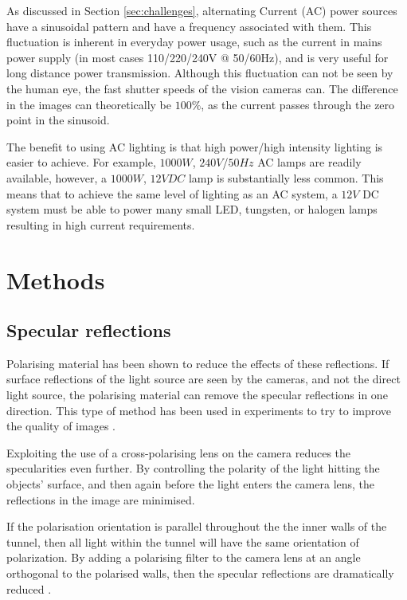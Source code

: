 \documentclass[fleqn,twoside,12pt]{report}
\begin{document}
As discussed in Section \ref{sec:challenges}, alternating Current (AC) power sources have a sinusoidal pattern and have a frequency associated with them. This fluctuation is inherent in everyday power usage, such as the current in mains power supply (in most cases 110/220/240V @ 50/60Hz), and is very useful for long distance power transmission. Although this fluctuation can not be seen by the human eye, the fast shutter speeds of the vision cameras can. The difference in the images can theoretically be $100\%$, as the current passes through the zero point in the sinusoid.

The benefit to using AC lighting is that high power/high intensity lighting is easier to achieve. For example, $1000W$, $240V$/$50Hz$ AC lamps are readily available, however, a $1000W$, $12VDC$ lamp is substantially less common. This means that to achieve the same level of lighting as an AC system, a $12V$ DC system must be able to power many small LED, tungsten, or halogen lamps resulting in high current requirements.  


\section{Methods}

\subsection{Specular reflections}

Polarising material has been shown to reduce the effects of these reflections. If surface reflections of the light source are seen by the cameras, and not the direct light source, the polarising material can remove the specular reflections in one direction. This type of method has been used in experiments to try to improve the quality of images \cite{atkinson, wolff}.

Exploiting the use of a cross-polarising lens on the camera reduces the specularities even further. By controlling the polarity of the light hitting the objects' surface, and then again before the light enters the camera lens, the reflections in the image are minimised.

If the polarisation orientation is parallel throughout the the inner walls of the tunnel, then all light within the tunnel will have the same orientation of polarization. By adding a polarising filter to the camera lens at an angle orthogonal to the polarised walls, then the specular reflections are dramatically reduced \cite{anderson, kuranov}.
\end{document}

